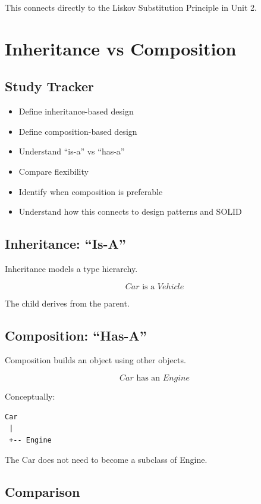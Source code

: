 \documentclass[11pt,a4paper]{article}
\newcommand{\checkitem}{$\square$}
\begin{document}
This connects directly to the Liskov Substitution Principle in Unit 2.

\section{Inheritance vs Composition}

\subsection{Study Tracker}

\begin{itemize}[label=\checkitem]
    \item Define inheritance-based design
    \item Define composition-based design
    \item Understand ``is-a'' vs ``has-a''
    \item Compare flexibility
    \item Identify when composition is preferable
    \item Understand how this connects to design patterns and SOLID
\end{itemize}

\subsection{Inheritance: ``Is-A''}

Inheritance models a type hierarchy.

\[
Car \text{ is a } Vehicle
\]

The child derives from the parent.

\subsection{Composition: ``Has-A''}

Composition builds an object using other objects.

\[
Car \text{ has an } Engine
\]

Conceptually:

\begin{verbatim}
Car
 |
 +-- Engine
\end{verbatim}

The Car does not need to become a subclass of Engine.

\subsection{Comparison}
\end{document}
